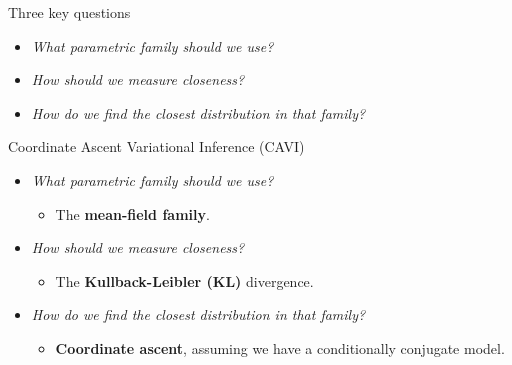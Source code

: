 \documentclass[aspectratio=169]{beamer}
\begin{document}
\begin{frame}{Three key questions}
    \begin{itemize}
        \item \textit{What parametric family should we use? }
        \item \textit{How should we measure closeness? }
        \item \textit{How do we find the closest distribution in that family?}        
    \end{itemize}
    
\end{frame}
    

\begin{frame}{Coordinate Ascent Variational Inference (CAVI)}
\begin{itemize}
    \item \textit{What parametric family should we use? }
    \begin{itemize}
        \item The \textbf{mean-field family}.
    \end{itemize}
    
    \item \textit{How should we measure closeness? }
    \begin{itemize}
        \item The \textbf{Kullback-Leibler (KL)} divergence.
    \end{itemize}
    
    \item \textit{How do we find the closest distribution in that family?}
    \begin{itemize}
        \item \textbf{Coordinate ascent}, assuming we have a conditionally conjugate model.
    \end{itemize}
\end{itemize}

\end{frame}
\end{document}
